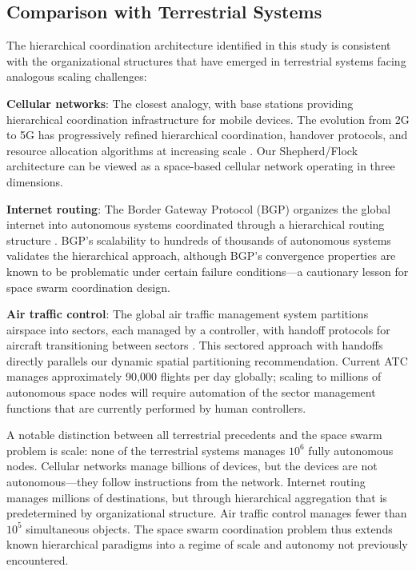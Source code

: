 \documentclass[journal]{IEEEtran}
\begin{document}
\subsection{Comparison with Terrestrial Systems}

The hierarchical coordination architecture identified in this study is consistent with the organizational structures that have emerged in terrestrial systems facing analogous scaling challenges:

\textbf{Cellular networks}: The closest analogy, with base stations providing hierarchical coordination infrastructure for mobile devices. The evolution from 2G to 5G has progressively refined hierarchical coordination, handover protocols, and resource allocation algorithms at increasing scale \cite{rappaport_wireless}. Our Shepherd/Flock architecture can be viewed as a space-based cellular network operating in three dimensions.

\textbf{Internet routing}: The Border Gateway Protocol (BGP) organizes the global internet into autonomous systems coordinated through a hierarchical routing structure \cite{rekhter_bgp}. BGP's scalability to hundreds of thousands of autonomous systems validates the hierarchical approach, although BGP's convergence properties are known to be problematic under certain failure conditions---a cautionary lesson for space swarm coordination design.

\textbf{Air traffic control}: The global air traffic management system partitions airspace into sectors, each managed by a controller, with handoff protocols for aircraft transitioning between sectors \cite{icao_atm}. This sectored approach with handoffs directly parallels our dynamic spatial partitioning recommendation. Current ATC manages approximately 90{,}000 flights per day globally; scaling to millions of autonomous space nodes will require automation of the sector management functions that are currently performed by human controllers.

A notable distinction between all terrestrial precedents and the space swarm problem is scale: none of the terrestrial systems manages $10^6$ fully autonomous nodes. Cellular networks manage billions of devices, but the devices are not autonomous---they follow instructions from the network. Internet routing manages millions of destinations, but through hierarchical aggregation that is predetermined by organizational structure. Air traffic control manages fewer than $10^5$ simultaneous objects. The space swarm coordination problem thus extends known hierarchical paradigms into a regime of scale and autonomy not previously encountered.
\end{document}
